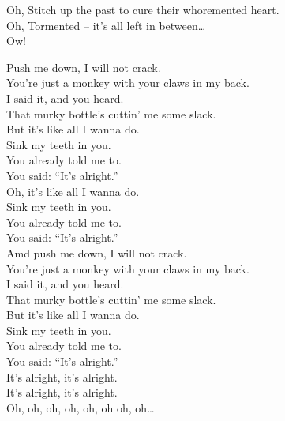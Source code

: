 Oh, Stitch up the past to cure their whoremented heart. \\

Oh, Tormented  -- it's all left in between… \\
Ow! \\




Push me down, I will not crack. \\
You're just a monkey with your claws in my back. \\
I said it, and you heard. \\
That murky bottle's cuttin' me some slack. \\

But it's like all I wanna do. \\
Sink my teeth in you. \\
You already told me to. \\
You said: ``It's alright.'' \\

Oh, it's like all I wanna do. \\
Sink my teeth in you. \\
You already told me to. \\
You said: ``It's alright.'' \\

Amd push me down, I will not crack. \\
You're just a monkey with your claws in my back. \\
I said it, and you heard. \\
That murky bottle's cuttin' me some slack. \\

But it's like all I wanna do. \\
Sink my teeth in you. \\
You already told me to. \\
You said: ``It's alright.'' \\

It's alright, it's alright. \\
It's alright, it's alright. \\

Oh, oh, oh, oh, oh, oh oh, oh… \\


